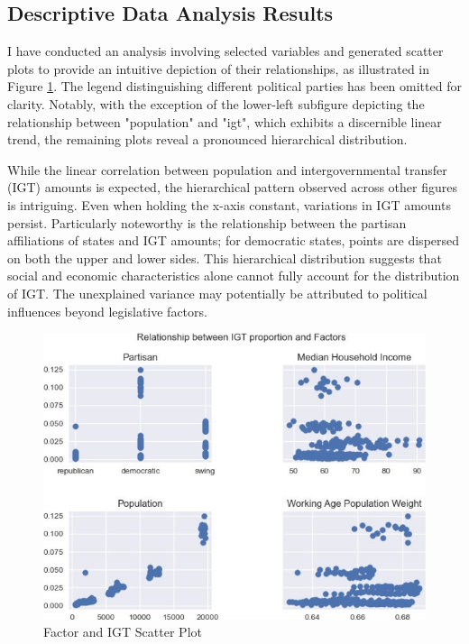 \documentclass[man]{apa7}
\begin{document}
\subsection{Descriptive Data Analysis Results}


I have conducted an analysis involving selected variables and generated scatter plots to provide an intuitive depiction of their relationships, as illustrated in Figure \ref{Figure 2.3}. The legend distinguishing different political parties has been omitted for clarity. Notably, with the exception of the lower-left subfigure depicting the relationship between "population" and "igt", which exhibits a discernible linear trend, the remaining plots reveal a pronounced hierarchical distribution.

While the linear correlation between population and intergovernmental transfer (IGT) amounts is expected, the hierarchical pattern observed across other figures is intriguing. Even when holding the x-axis constant, variations in IGT amounts persist. Particularly noteworthy is the relationship between the partisan affiliations of states and IGT amounts; for democratic states, points are dispersed on both the upper and lower sides. This hierarchical distribution suggests that social and economic characteristics alone cannot fully account for the distribution of IGT. The unexplained variance may potentially be attributed to political influences beyond legislative factors.

\begin{figure}[H]
  \centering
  \includegraphics[scale=1]{Figures/IGT and factors.jpg}
  \caption[IGT and Factors Scatter Plot]{Factor and IGT Scatter Plot
    \texttt{} }
  \label{Figure 2.3}
\end{figure}
\end{document}
